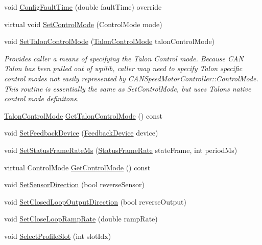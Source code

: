 \begin{DoxyCompactItemize}
void \hyperlink{class_c_a_n_talon_a16100a8dc3b54d7ffc842833cef8f3f1}{Config\+Fault\+Time} (double fault\+Time) override
\item 
virtual void \hyperlink{class_c_a_n_talon_a2b962ea4bd8e67c0d25886d8d81000b5}{Set\+Control\+Mode} (Control\+Mode mode)
\item 
void \hyperlink{class_c_a_n_talon_a08d03dbd23a98e7af25fee772f680f43}{Set\+Talon\+Control\+Mode} (\hyperlink{class_c_a_n_talon_a0e4915b95f71a7091e3a1323f3ec9e1f}{Talon\+Control\+Mode} talon\+Control\+Mode)
\begin{DoxyCompactList}\small\item\em Provides caller a means of specifying the Talon Control mode. Because C\+AN Talon has been pulled out of wpilib, caller may need to specify Talon specific control modes not easily represented by C\+A\+N\+Speed\+Motor\+Controller\+::\+Control\+Mode. This routine is essentially the same as Set\+Control\+Mode, but uses Talon\textquotesingle{}s native control mode definitons. \end{DoxyCompactList}\item 
\hyperlink{class_c_a_n_talon_a0e4915b95f71a7091e3a1323f3ec9e1f}{Talon\+Control\+Mode} \hyperlink{class_c_a_n_talon_ad598ba3f77946f1f09d1e3ed5eb8fe75}{Get\+Talon\+Control\+Mode} () const
\item 
void \hyperlink{class_c_a_n_talon_a11950b306536c639e2a33b61f5916178}{Set\+Feedback\+Device} (\hyperlink{class_c_a_n_talon_a4a8af675a7712f305d17be2b825005e3}{Feedback\+Device} device)
\item 
void \hyperlink{class_c_a_n_talon_a7c0071642dbc8c690f7a4d5520f7a8a2}{Set\+Status\+Frame\+Rate\+Ms} (\hyperlink{class_c_a_n_talon_acac4ef6508d842a8fe4301284149720e}{Status\+Frame\+Rate} state\+Frame, int period\+Ms)
\item 
virtual Control\+Mode \hyperlink{class_c_a_n_talon_a3ef9f9053e55afd0bfb5a5fd85359743}{Get\+Control\+Mode} () const
\item 
void \hyperlink{class_c_a_n_talon_a11381d58bbcd47c3fb2235fd76161ff2}{Set\+Sensor\+Direction} (bool reverse\+Sensor)
\item 
void \hyperlink{class_c_a_n_talon_a17842e8f2d2fbcf8cc14558ebc83c48b}{Set\+Closed\+Loop\+Output\+Direction} (bool reverse\+Output)
\item 
void \hyperlink{class_c_a_n_talon_a1390fed0cb26b604fe3b97e732a6630d}{Set\+Close\+Loop\+Ramp\+Rate} (double ramp\+Rate)
\item 
void \hyperlink{class_c_a_n_talon_a0f478462884ed5e541179821c44b724f}{Select\+Profile\+Slot} (int slot\+Idx)

\end{DoxyCompactItemize}
